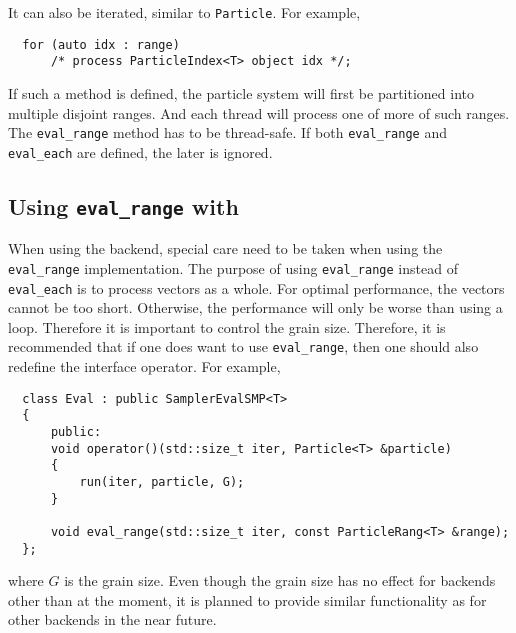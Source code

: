It can also be iterated, similar to \verb|Particle|. For example,
\begin{Verbatim}
  for (auto idx : range)
      /* process ParticleIndex<T> object idx */;
\end{Verbatim}
If such a method is defined, the particle system will first be partitioned into
multiple disjoint ranges. And each thread will process one of more of such
ranges. The \verb|eval_range| method has to be thread-safe. If both
\verb|eval_range| and \verb|eval_each| are defined, the later is ignored.

\subsection{Using \texttt{eval\_range} with \tbb}

When using the \tbb backend, special care need to be taken when using the
\verb|eval_range| implementation. The purpose of using \verb|eval_range|
instead of \verb|eval_each| is to process vectors as a whole. For optimal
performance, the vectors cannot be too short. Otherwise, the performance will
only be worse than using a loop. Therefore it is important to control the grain
size. Therefore, it is recommended that if one does want to use
\verb|eval_range|, then one should also redefine the interface operator. For
example,
\begin{Verbatim}
  class Eval : public SamplerEvalSMP<T>
  {
      public:
      void operator()(std::size_t iter, Particle<T> &particle)
      {
          run(iter, particle, G);
      }

      void eval_range(std::size_t iter, const ParticleRang<T> &range);
  };
\end{Verbatim}
where $G$ is the grain size. Even though the grain size has no effect for
backends other than \tbb at the moment, it is planned to provide similar
functionality as \tbb for other backends in the near future.
